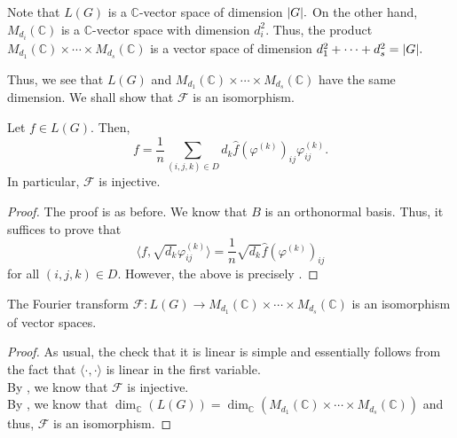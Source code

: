 \begin{rem} \label{rem:dimLGdimmatrix}
    Note that $L(G)$ is a $\mathbb{C}$-vector space of dimension ${\left\lvert G \right\lvert}.$ On the other hand, $M_{d_i}(\mathbb{C})$ is a $\mathbb{C}$-vector space with dimension $d_i^2.$ Thus, the product $M_{d_1}(\mathbb{C}) \times \cdots \times M_{d_s}(\mathbb{C})$ is a vector space of dimension $d_1^2 + \cdots + d_s^2 = {\left\lvert G \right\lvert}.$

    Thus, we see that $L(G)$ and $M_{d_1}(\mathbb{C}) \times \cdots \times M_{d_s}(\mathbb{C})$ have the same dimension. We shall show that $\mathcal{F}$ is an isomorphism.
\end{rem}

\begin{thm} \label{thm:fourierinvgen}
    Let $f \in L(G).$ Then,
    \begin{equation*} 
        f = \frac{1}{n}\sum_{(i, j, k) \in D}d_k \widehat{f}(\varphi^{(k)})_{ij} \varphi^{(k)}_{ij}.    
    \end{equation*}
    In particular, $\mathcal{F}$ is injective.
\end{thm}
\begin{proof} 
    The proof is as before. We know that $B$ is an orthonormal basis. Thus, it suffices to prove that
    \begin{equation*} 
        \langle f, \sqrt{d_k}\varphi^{(k)}_{ij}\rangle = \frac{1}{n}\sqrt{d_k} \widehat{f}(\varphi^{(k)})_{ij}
    \end{equation*}
    for all $(i, j, k) \in D.$ However, the above is precisely .
\end{proof}

\begin{thm}
    The Fourier transform $\mathcal{F} : L(G) \to M_{d_1}(\mathbb{C}) \times \cdots \times M_{d_s}(\mathbb{C})$ is an isomorphism of vector spaces.
\end{thm}
\begin{proof} 
    As usual, the check that it is linear is simple and essentially follows from the fact that $\langle \cdot , \cdot \rangle$ is linear in the first variable. \\
    By , we know that $\mathcal{F}$ is injective. \\
    By , we know that $\dim_{\mathbb{C}}(L(G)) = \dim_{\mathbb{C}}(M_{d_1}(\mathbb{C}) \times \cdots \times M_{d_s}(\mathbb{C}))$ and thus, $\mathcal{F}$ is an isomorphism.
\end{proof}


